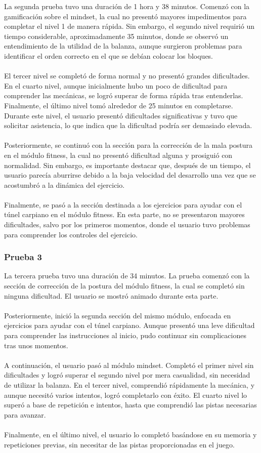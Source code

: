 La segunda prueba tuvo una duración de 1 hora y 38 minutos. Comenzó con la gamificación sobre el mindset,
 la cual no presentó mayores impedimentos para completar el nivel 1 de manera rápida.
  Sin embargo, el segundo nivel requirió un tiempo considerable, aproximadamente 35 minutos, 
  donde se observó un entendimiento de la utilidad de la balanza, aunque surgieron problemas 
  para identificar el orden correcto en el que se debían colocar los bloques.
\\\\
El tercer nivel se completó de forma normal y no presentó grandes dificultades.
 En el cuarto nivel, aunque inicialmente hubo un poco de dificultad para comprender las mecánicas,
  se logró superar de forma rápida tras entenderlas. Finalmente, el último nivel tomó alrededor
   de 25 minutos en completarse. Durante este nivel, el usuario presentó dificultades significativas
    y tuvo que solicitar asistencia, lo que indica que la dificultad podría ser demasiado elevada.
  \\  \\
    Posteriormente, se continuó con la sección para la corrección de la mala postura en el módulo fitness, la cual no presentó dificultad alguna y prosiguió con normalidad. Sin embargo, es importante destacar que, después de un tiempo, el usuario parecía aburrirse debido a la baja velocidad del desarrollo una vez que se acostumbró a la dinámica del ejercicio.
\\\\
Finalmente, se pasó a la sección destinada a los ejercicios para ayudar con el túnel carpiano en el módulo fitness. En esta parte, no se presentaron mayores dificultades, salvo por los primeros momentos, donde el usuario tuvo problemas para comprender los controles del ejercicio.

\subsubsection{Prueba 3}
La tercera prueba tuvo una duración de 34 minutos.
La prueba comenzó con la sección de corrección de la postura del módulo fitness, la cual se completó sin ninguna dificultad. El usuario se mostró animado durante esta parte.
\\\\
Posteriormente, inició la segunda sección del mismo módulo, enfocada en ejercicios para ayudar con el túnel carpiano. Aunque presentó una leve dificultad para comprender las instrucciones al inicio, pudo continuar sin complicaciones tras unos momentos.
\\\\
A continuación, el usuario pasó al módulo mindset. Completó el primer nivel sin dificultades y logró superar el segundo nivel por mera casualidad, sin necesidad de utilizar la balanza.
En el tercer nivel, comprendió rápidamente la mecánica, y aunque necesitó varios intentos, logró completarlo con éxito. El cuarto nivel lo superó a base de repetición e intentos, hasta que comprendió las pistas necesarias para avanzar.
\\\\
Finalmente, en el último nivel, el usuario lo completó basándose en su memoria y repeticiones previas, sin necesitar de las pistas proporcionadas en el juego.
